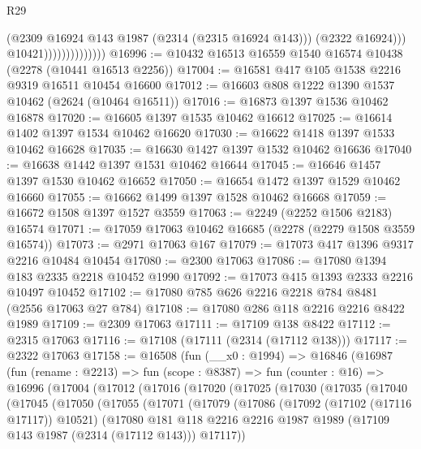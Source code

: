 \begin{lexlean}{R29}
\begin{coremodule}
                                    (@2309 @16924 @143 @1987 (@2314 (@2315 @16924 @143)))
                                    (@2322 @16924)))
                                @10421))))))))))))))
@16996 := @10432 @16513 @16559 @1540 @16574 @10438 (@2278 (@10441 @16513 @2256))
@17004 := @16581 @417 @105 @1538 @2216 @9319 @16511 @10454 @16600
@17012 := @16603 @808 @1222 @1390 @1537 @10462 (@2624 (@10464 @16511))
@17016 := @16873 @1397 @1536 @10462 @16878
@17020 := @16605 @1397 @1535 @10462 @16612
@17025 := @16614 @1402 @1397 @1534 @10462 @16620
@17030 := @16622 @1418 @1397 @1533 @10462 @16628
@17035 := @16630 @1427 @1397 @1532 @10462 @16636
@17040 := @16638 @1442 @1397 @1531 @10462 @16644
@17045 := @16646 @1457 @1397 @1530 @10462 @16652
@17050 := @16654 @1472 @1397 @1529 @10462 @16660
@17055 := @16662 @1499 @1397 @1528 @10462 @16668
@17059 := @16672 @1508 @1397 @1527 @3559
@17063 := @2249 (@2252 @1506 @2183) @16574
@17071 := @17059 @17063 @10462 @16685 (@2278 (@2279 @1508 @3559 @16574))
@17073 := @2971 @17063 @167
@17079 := @17073 @417 @1396 @9317 @2216 @10484 @10454
@17080 := @2300 @17063
@17086 := @17080 @1394 @183 @2335 @2218 @10452 @1990
@17092 := @17073 @415 @1393 @2333 @2216 @10497 @10452
@17102 := @17080 @785 @626 @2216 @2218 @784 @8481 (@2556 @17063 @27 @784)
@17108 := @17080 @286 @118 @2216 @2216 @8422 @1989
@17109 := @2309 @17063
@17111 := @17109 @138 @8422
@17112 := @2315 @17063
@17116 := @17108 (@17111 (@2314 (@17112 @138)))
@17117 := @2322 @17063
@17158 := @16508
    (fun (__x0 : @1994) =>
    @16846
      (@16987
        (fun (rename : @2213) =>
        fun (scope : @8387) =>
        fun (counter : @16) =>
        @16996
          (@17004
            (@17012
              (@17016
                (@17020
                  (@17025
                    (@17030
                      (@17035
                        (@17040
                          (@17045
                            (@17050
                              (@17055
                                (@17071
                                  (@17079
                                    (@17086
                                      (@17092 (@17102 (@17116 @17117)) @10521)
                                      (@17080
                                        @181
                                        @118
                                        @2216
                                        @2216
                                        @1987
                                        @1989
                                        (@17109 @143 @1987 (@2314 (@17112 @143)))
                                        @17117))

\end{coremodule}
\end{lexlean}
